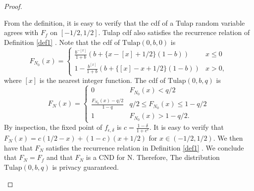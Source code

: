 \documentclass{article}
\begin{document}
\begin{proof}
\begin{enumerate}
    From the definition, it is easy to verify that the cdf of a Tulap random variable agrees with $F_f$ on $[-1/2,1/2]$. Tulap cdf also satisfies the recurrence relation of Definition \ref{def1} \parencite{awan2023canonical}. 
    Note that the cdf of $\mathrm{Tulap}(0,b,0)$ is 
    \[F_{N_0}(x) = \begin{cases}
    \frac{b^{-[x]}}{1+b}(b+\{x-[x]+1/2\}(1-b))& x\leq 0\\
    1- \frac{b^{[x]}}{1+b}(b+\{[x]-x+1/2\}(1-b))&x>0,
    \end{cases}\]
    where $[x]$ is the nearest integer function. The cdf of $\mathrm{Tulap}(0,b,q)$ is
    \[F_N(x) = \begin{cases}
    0&F_{N_0}(x)<q/2\\
    \frac{F_{N_0}(x)-q/2}{1-q}& q/2\leq F_{N_0}(x)\leq 1-q/2\\
    1&F_{N_0}(x)>1-q/2.
    \end{cases}\]
    By inspection, the fixed point of $f_{\epsilon,\delta}$ is $c=\frac{1-\delta}{1+e^\epsilon}$. It is easy to verify that $F_N(x) = c(1/2-x) + (1-c)(x+1/2)$ for $x\in (-1/2,1/2)$. 
    We then have that $F_N$ satisfies the recurrence relation in Definition \ref{def1} \parencite{awan2023canonical}. We conclude that $F_N = F_f$ and that $F_N$ is a CND for N. Therefore, The distribution $\mathrm{Tulap}(0,b,q)$ is privacy guaranteed.
\end{enumerate}
\end{proof}

\printbibliography
\end{document}
